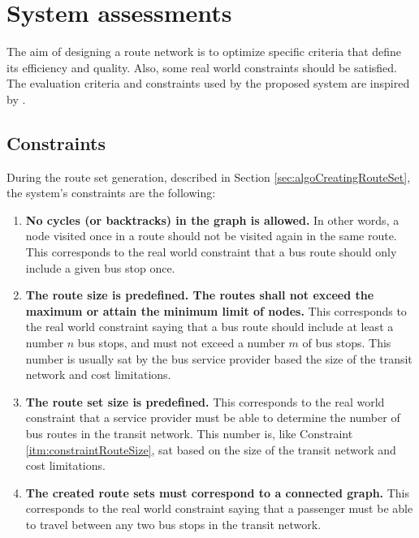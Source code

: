 \section{System assessments}
The aim of designing a route network is to optimize specific criteria that define its efficiency and quality. Also, some real world constraints should be satisfied. The evaluation criteria and constraints used by the proposed system are inspired by \citep{kechagiopoulos14}.

\subsection{Constraints}
\label{sec:algoConstraints}
During the route set generation, described in Section \vref{sec:algoCreatingRouteSet}, the system's constraints are the following: 
\begin{enumerate}
\item \label{itm:constraintCycles} \textbf{No cycles (or backtracks) in the graph is allowed.} In other words, a node visited once in a route should not be visited again in the same route. 
This corresponds to the real world constraint that a bus route should only include a given bus stop once. 
\item \label{itm:constraintRouteSize} \textbf{The route size is predefined. The routes shall not exceed the maximum or attain the minimum limit of nodes.}
This corresponds to the real world constraint saying that a bus route should include at least a number $n$ bus stops, and must not exceed a number $m$ of bus stops. This number is usually sat by the bus service provider based the size of the transit network and cost limitations. 
\item \label{itm:constraintRouteSetSize} \textbf{The route set size is predefined.}
This corresponds to the real world constraint that a service provider must be able to determine the number of bus routes in the transit network. This number is, like Constraint \ref{itm:constraintRouteSize}, sat based on the size of the transit network and cost limitations. 
\item \label{itm:criteriaConnectedGraph} \textbf{The created route sets must correspond to a connected graph.}
This corresponds to the real world constraint saying that a passenger must be able to travel between any two bus stops in the transit network. 
\end{enumerate}

